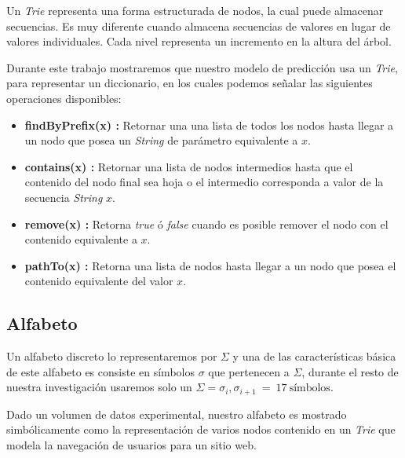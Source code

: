 Un \emph{Trie} representa una forma  estructurada de nodos, la cual puede almacenar secuencias. %
Es muy diferente cuando almacena secuencias de valores en lugar de valores individuales. Cada nivel representa un incremento en la altura del árbol.


Durante este trabajo mostraremos que nuestro modelo de predicción usa un \emph{Trie}, para representar un diccionario, en los cuales podemos señalar las siguientes operaciones disponibles:

	\begin{itemize}	
		\item \textbf{findByPrefix(x) :}  Retornar una una lista de todos los nodos hasta llegar a un nodo que posea un \emph{String} de parámetro equivalente a $x$.
		
		\item \textbf{contains(x) :} Retornar una lista de nodos intermedios hasta que el contenido del nodo final sea hoja o el intermedio corresponda a valor de la secuencia \emph{String} $x$.
		
		\item \textbf{remove(x) :} Retorna \emph{true} ó \emph{false} cuando es posible remover el nodo con el contenido equivalente a $x$.
		
		\item \textbf{pathTo(x) :} Retorna una lista de nodos hasta llegar a un nodo que posea el contenido equivalente del valor $x$.
	\end{itemize}







\subsection{Alfabeto}

Un alfabeto discreto lo representaremos por $\Sigma$ y una de las características básica de este alfabeto es consiste en símbolos $\sigma$ que pertenecen a $\Sigma$, durante el resto de nuestra investigación usaremos solo un $\Sigma = \sigma_{i},\sigma_{i+1}\ =\ 17\  \mbox{símbolos}$.



Dado un volumen de datos experimental, nuestro alfabeto es mostrado simbólicamente como la representación de varios nodos contenido en un \emph{Trie} que modela la navegación de usuarios para un sitio web.

